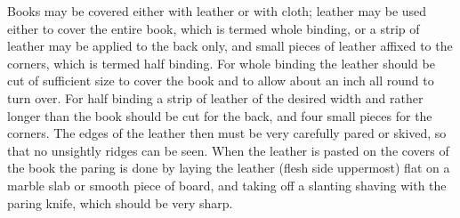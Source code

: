\documentclass[twoside]{book}
\begin{document}
\noindent
Books may be covered either with leather or with
cloth; leather may be used either to cover the
entire book, which is termed whole binding, or a
strip of leather may be applied to the back only,
and small pieces of leather affixed to the corners,
which is termed half binding. For whole binding
the leather should be cut of sufficient size to cover
the book and to allow about an inch all round to
turn over. For half binding a strip of leather of
the desired width and rather longer than the book
should be cut for the back, and four small pieces
for the corners. The edges of the leather then must
be very carefully pared or skived, so that no
unsightly ridges can be seen. When the leather is
pasted on the covers of the book the paring is done
by laying the leather (flesh side uppermost) flat on a
marble slab or smooth piece of board, and taking
off a slanting shaving with the paring knife, which
should be very sharp.
\end{document}
